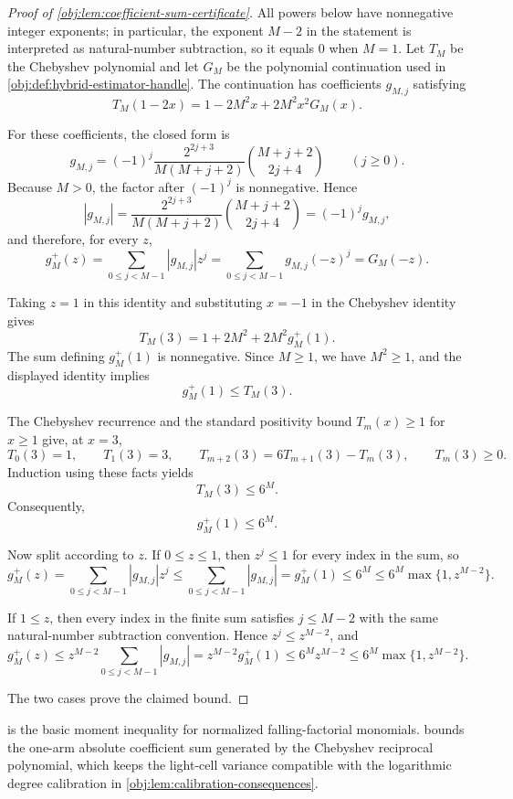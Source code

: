\documentclass[11pt]{article}
\begin{document}
\begin{proof}[Proof of \cref{obj:lem:coefficient-sum-certificate}]
All powers below have nonnegative integer exponents; in particular, the exponent \(M-2\) in the statement is interpreted as natural-number subtraction, so it equals \(0\) when \(M=1\).  Let \(T_M\) be the Chebyshev polynomial and let \(G_M\) be the polynomial continuation used in \cref{obj:def:hybrid-estimator-handle}.  The continuation has coefficients \(g_{M,j}\) satisfying
\[
T_M(1-2x)
=
1-2M^2x+2M^2x^2G_M(x).
\]

For these coefficients, the closed form is
\[
g_{M,j}
=
(-1)^j
\frac{2^{2j+3}}{M(M+j+2)}
{M+j+2\choose 2j+4}
\qquad (j\ge0).
\]
Because \(M>0\), the factor after \((-1)^j\) is nonnegative.  Hence
\[
|g_{M,j}|
=
\frac{2^{2j+3}}{M(M+j+2)}
{M+j+2\choose 2j+4}
=
(-1)^j g_{M,j},
\]
and therefore, for every \(z\),
\[
g_M^+(z)
=
\sum_{0\le j<M-1}|g_{M,j}|z^j
=
\sum_{0\le j<M-1}g_{M,j}(-z)^j
=
G_M(-z).
\]

Taking \(z=1\) in this identity and substituting \(x=-1\) in the Chebyshev identity gives
\[
T_M(3)
=
1+2M^2+2M^2g_M^+(1).
\]
The sum defining \(g_M^+(1)\) is nonnegative.  Since \(M\ge1\), we have \(M^2\ge1\), and the displayed identity implies
\[
g_M^+(1)\le T_M(3).
\]

The Chebyshev recurrence and the standard positivity bound \(T_m(x)\ge1\) for \(x\ge1\) give, at \(x=3\),
\[
T_0(3)=1,\qquad T_1(3)=3,\qquad
T_{m+2}(3)=6T_{m+1}(3)-T_m(3),\qquad T_m(3)\ge0.
\]
Induction using these facts yields
\[
T_M(3)\le 6^M.
\]
Consequently,
\[
g_M^+(1)\le 6^M.
\]

Now split according to \(z\).  If \(0\le z\le1\), then \(z^j\le1\) for every index in the sum, so
\[
g_M^+(z)
=
\sum_{0\le j<M-1}|g_{M,j}|z^j
\le
\sum_{0\le j<M-1}|g_{M,j}|
=
g_M^+(1)
\le 6^M
\le 6^M\max\{1,z^{M-2}\}.
\]

If \(1\le z\), then every index in the finite sum satisfies \(j\le M-2\) with the same natural-number subtraction convention.  Hence \(z^j\le z^{M-2}\), and
\[
g_M^+(z)
\le
z^{M-2}\sum_{0\le j<M-1}|g_{M,j}|
=
z^{M-2}g_M^+(1)
\le
6^M z^{M-2}
\le
6^M\max\{1,z^{M-2}\}.
\]

The two cases prove the claimed bound.
\end{proof}

 is the basic moment inequality for normalized falling-factorial monomials.  bounds the one-arm absolute coefficient sum generated by the Chebyshev reciprocal polynomial, which keeps the light-cell variance compatible with the logarithmic degree calibration in \cref{obj:lem:calibration-consequences}.
\end{document}
